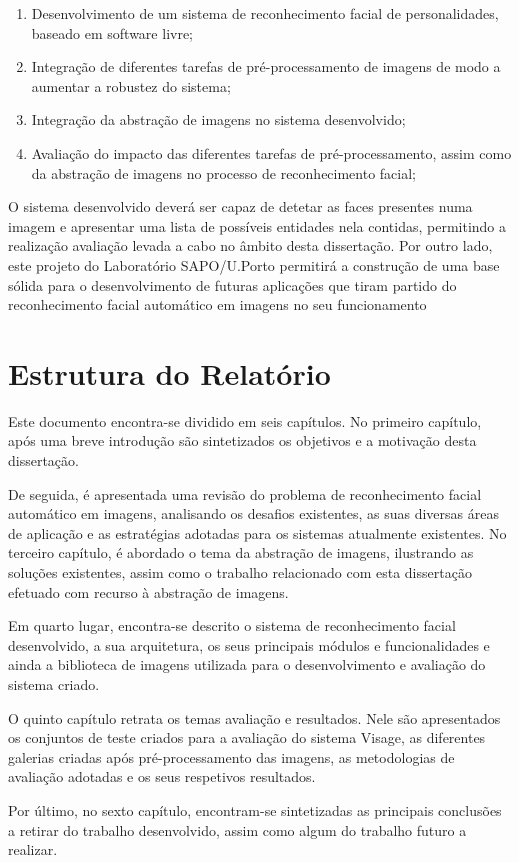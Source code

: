 \begin{enumerate}
\item Desenvolvimento de um sistema de reconhecimento facial de personalidades, baseado em software livre;
\item Integração de diferentes tarefas de pré-processamento de imagens de modo a aumentar a robustez do sistema;
\item Integração da abstração de imagens no sistema desenvolvido;
\item Avaliação do impacto das diferentes tarefas de pré-processamento, assim como da abstração de imagens no processo de reconhecimento facial;
\end{enumerate}

O sistema desenvolvido deverá ser capaz de detetar as faces presentes numa imagem e apresentar uma lista de possíveis entidades nela contidas, permitindo a realização avaliação levada a cabo no âmbito desta dissertação. Por outro lado, este projeto do Laboratório SAPO/U.Porto permitirá a construção de uma base sólida para o desenvolvimento de futuras aplicações que tiram partido do reconhecimento facial automático em imagens no seu funcionamento

\section{Estrutura do Relatório} \label{sec:struct}
Este documento encontra-se dividido em seis capítulos. No primeiro capítulo, após uma breve introdução são sintetizados os objetivos e a motivação desta dissertação.

De seguida, é apresentada uma revisão do problema de reconhecimento facial automático em imagens, analisando os desafios existentes, as suas diversas áreas de aplicação e as estratégias adotadas para os sistemas atualmente existentes. No terceiro capítulo, é abordado o tema da abstração de imagens, ilustrando as soluções existentes, assim como o trabalho relacionado com esta dissertação efetuado com  recurso à abstração de imagens.

Em quarto lugar, encontra-se descrito o sistema de reconhecimento facial desenvolvido, a sua arquitetura, os seus principais módulos e funcionalidades e ainda a biblioteca de imagens utilizada para o desenvolvimento e avaliação do sistema criado.

O quinto capítulo retrata os temas avaliação e resultados. Nele são apresentados os conjuntos de teste criados para a avaliação do sistema Visage, as diferentes galerias criadas após pré-processamento das imagens, as metodologias de avaliação adotadas e os seus respetivos resultados.

Por último, no sexto capítulo, encontram-se sintetizadas as principais conclusões a retirar do trabalho desenvolvido, assim como algum do trabalho futuro a realizar.